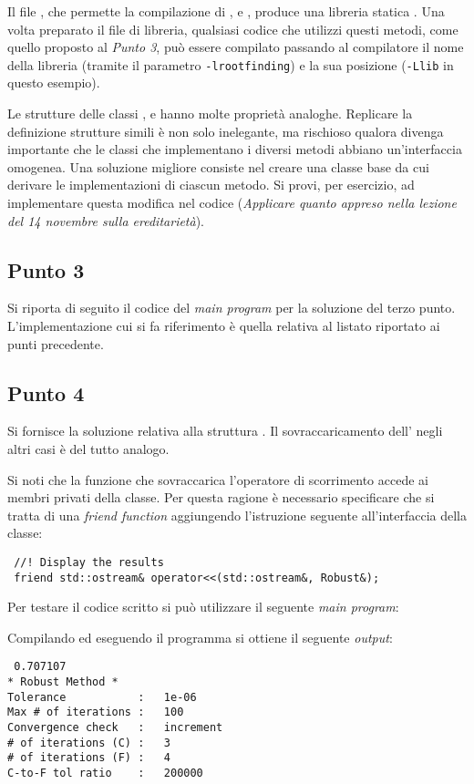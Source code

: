 Il file , che permette la  compilazione di ,
 e , produce una libreria statica
. Una volta preparato il file di libreria, qualsiasi
codice che utilizzi questi metodi, come quello proposto al \emph{Punto 3}, pu\`o
essere compilato passando al compilatore il nome della libreria (tramite il
parametro \texttt{-lrootfinding}) e la sua posizione (\texttt{-Llib} in questo esempio).

Le strutture delle classi ,
 e  hanno molte propriet\`a analoghe. Replicare
la definizione strutture simili \`e non solo inelegante, ma rischioso
qualora divenga importante %
che le classi che implementano i diversi metodi abbiano un'interfaccia
omogenea. Una soluzione migliore consiste nel creare una classe base
 da cui derivare le implementazioni di ciascun
metodo. Si provi, per esercizio, ad implementare questa modifica nel
codice (\emph{Applicare quanto appreso nella lezione del 14 novembre sulla
ereditariet\`a}).
%
%
%


\subsection*{Punto 3}
Si riporta di seguito il codice del \emph{main program} per la
soluzione del terzo punto. L'implementazione cui si fa riferimento
\`e quella relativa al listato riportato ai punti precedente.
\lstset{basicstyle=\scriptsize\sf}


\lstset{basicstyle=\sf}


 \subsection*{Punto 4}
  Si fornisce la soluzione relativa alla struttura . Il
  sovraccaricamento dell' negli altri casi \`e del tutto
 analogo.
 \lstset{basicstyle=\scriptsize\sf}
 
 \lstset{basicstyle=\sf}
 
 
 Si noti che la funzione che sovraccarica l'operatore di scorrimento
 accede ai membri privati della classe. Per questa ragione \`e
 necessario specificare che si tratta di una \emph{friend function}
 aggiungendo l'istruzione seguente all'interfaccia della classe:
 \begin{lstlisting}
 //! Display the results
 friend std::ostream& operator<<(std::ostream&, Robust&);
 \end{lstlisting}
 
 Per testare il codice scritto si pu\`o utilizzare il seguente \emph{main program}:
 \lstset{basicstyle=\scriptsize\sf}
 
 \lstset{basicstyle=\sf}
 
 Compilando ed eseguendo il programma si ottiene il seguente \emph{output}:
 \begin{verbatim}
 0.707107
* Robust Method *
Tolerance           :   1e-06
Max # of iterations :   100
Convergence check   :   increment
# of iterations (C) :   3
# of iterations (F) :   4
C-to-F tol ratio    :   200000
\end{verbatim}
